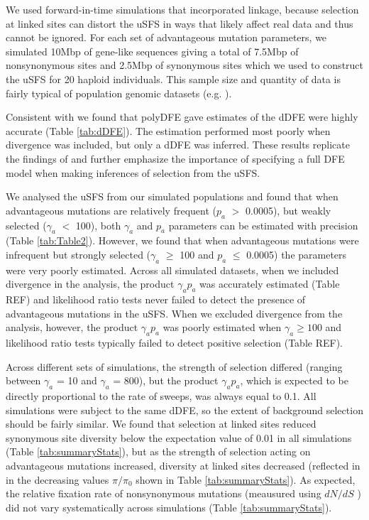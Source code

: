 \documentclass[11pt]{article}
\begin{document}
	We used forward-in-time simulations that incorporated linkage, because selection at linked sites can distort the uSFS in ways that likely affect real data and thus cannot be ignored. For each set of advantageous mutation parameters, we simulated 10Mbp of gene-like sequences giving a total of 7.5Mbp of nonsynonymous sites and 2.5Mbp of synonymous sites which we used to construct the uSFS for 20 haploid individuals. This sample size and quantity of data is fairly typical of population genomic datasets (e.g. \citealt{RN236, RN238, RN368}). 

	Consistent with \cite{RN354}  we found that polyDFE gave estimates of the dDFE were highly accurate (Table \ref{tab:dDFE}). The estimation performed most poorly when divergence was included, but only a dDFE was inferred. These results replicate the findings of \cite{RN354} and further emphasize the importance of specifying a full DFE model when making inferences of selection from the uSFS. 
	
	 We analysed the uSFS from our simulated populations and found that when advantageous mutations are relatively frequent ($p_a$ $>$ 0.0005), but weakly selected ($\gamma_a$ $<$ 100), both $\gamma_a$ and $p_a$ parameters can be estimated with precision (Table \ref{tab:Table2}). However, we found that when advantageous mutations were infrequent but strongly selected ($\gamma_a$ $\geq$ 100 and $p_a$ $\leq$ 0.0005) the parameters were very poorly estimated. Across all simulated datasets, when we included divergence in the analysis, the product $\gamma_a p_a$ was accurately estimated (Table REF) and likelihood ratio tests never failed to detect the presence of advantageous mutations in the uSFS. When we excluded divergence from the analysis, however, the product  $\gamma_a p_a$  was poorly estimated when $\gamma_a \geq 100$ and likelihood ratio tests typically failed to detect positive selection (Table REF).
	
	Across different sets of simulations, the strength of selection differed (ranging between $\gamma_a$ = 10 and $\gamma_a$ = 800), but the product $\gamma_a p_a$, which is expected to be directly proportional to the rate of sweeps, was always equal to 0.1. All simulations were subject to the same dDFE, so the extent of background selection should be fairly similar. We found that selection at linked sites reduced synonymous site diversity below the expectation value of 0.01 in all simulations (Table \ref{tab:summaryStats}),  but as the strength of selection acting on advantageous mutations increased, diversity at linked sites decreased (reflected in in the decreasing values $\pi/\pi_0$ shown in Table \ref{tab:summaryStats}). As expected, the relative fixation rate of nonsynonymous mutations (meausured using  $dN/dS$ ) did not vary systematically across simulations (Table \ref{tab:summaryStats}).
	
\end{document}

